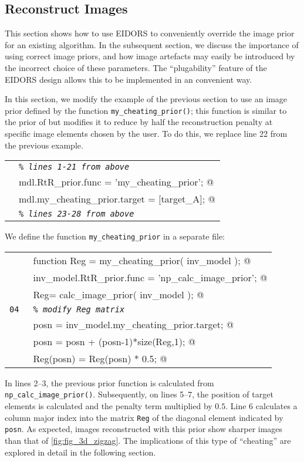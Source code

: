 \documentclass[12pt]{iopart}
\makeatletter
\newcommand{\CODEstart}{\medskip\begin{tabular}{ll}}
\newcommand{\CN}{\tt\scriptsize} %
\newcommand{\CC}{&\small\verb@}   % start code
\newcommand{\CI}{&\small\tt\em}   % start code
\newcommand{\CODEend}{\end{tabular}\medskip}
\makeatother
\begin{document}
\subsection{  Reconstruct Images }

This section shows how to use EIDORS to conveniently
override the image prior
for an existing algorithm. In the subsequent section,
we discuss the importance of using correct image priors,
and how image artefacts may easily be introduced by the incorrect
choice of these parameters. The ``plugability'' feature of the
EIDORS design allows this to be implemented in an convenient way.

In this section, we modify the example of the previous section
to use an image prior defined by the function
{\tt my\_cheating\_prior()}; this function is similar to the
prior of \cite{Polydorides_2002} but modifies it to reduce
by half the reconstruction penalty at specific image elements chosen by
the user. To do this, we replace line 22 from the previous
example.

\CODEstart
\CN    \CI \% lines 1-21 from above \\[-3pt]
\CN    \CC mdl.RtR_prior.func               = 'my_cheating_prior'; @\\[-3pt]
\CN    \CC mdl.my_cheating_prior.target = [target_A]; @\\[-3pt]
\CN    \CI \% lines 23-28 from above \\[-3pt]
\CODEend

We define the function {\tt my\_cheating\_prior} in a separate file:

\CODEstart
\CN    \CC function Reg = my_cheating_prior( inv_model ); @\\[-3pt]
\CN    \CC   inv_model.RtR_prior.func = 'np_calc_image_prior'; @\\[-3pt]
\CN    \CC   Reg= calc_image_prior( inv_model ); @\\[-3pt]
\CN 04 \CI   \% modify Reg matrix \\[-3pt]
\CN    \CC   posn = inv_model.my_cheating_prior.target; @\\[-3pt]
\CN    \CC   posn = posn + (posn-1)*size(Reg,1); @\\[-3pt]
\CN    \CC   Reg(posn) = Reg(posn) * 0.5; @\\[-3pt]
\CODEend

In lines 2--3, the previous prior function is calculated
from {\tt np\_calc\_image\_prior()}. Subsequently, on lines
5--7, the position of target elements is calculated and
the penalty term multiplied by $0.5$. Line 6 calculates
a column major index into the matrix {\tt Reg} of the
diagonal element indicated by {\tt posn}. As expected,
images reconstructed with this prior show sharper
images than that of \ref{fig:fig_3d_zigzag}.
The implications of this type of ``cheating'' are explored
in detail in the following section.
\end{document}
